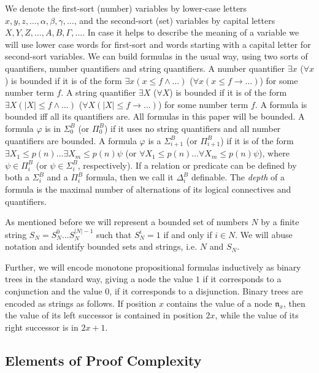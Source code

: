 \documentclass{LMCS}
\newcommand{\abs}[1]{\left\vert#1\right\vert}
\begin{document}
We denote the first-sort (number) variables by lower-case letters $ x,y,z,\dots,\alpha,\beta,\gamma,\dots$, and the second-sort (set)
variables by capital letters $ X,Y,Z,\dots,A,B,\Gamma,\dots$. In case it helps to describe the meaning of a variable we will use lower case words for first-sort and words starting with a capital letter for second-sort variables. We can build formulas in the usual way, using two sorts of
quantifiers, number quantifiers and string quantifiers. A number quantifier $\exists x$ ($\forall x$) is bounded
if it is of the form $\exists x (x\leq f\land\dots)$ ($\forall x (x\leq f\rightarrow\dots)$) for some number
term $f$. A string quantifier $\exists X$ ($\forall X$) is bounded if it is of the form $\exists X (\abs{X}\leq
f\land\dots)$ ($\forall X (\abs{X}\leq f\rightarrow\dots)$) for some number term $f$. A formula is bounded iff
all its quantifiers are. All formulas in this paper will be bounded. A formula $\varphi $ is in $\Sigma^B_0$ (or
$\Pi^B_{0}$) if it uses no string quantifiers and all number quantifiers are bounded. A formula $\varphi $ is a
$\Sigma^B_{i+1}$ (or $\Pi^B_{i+1}$) if it is of the form $\exists X_1\leq p(n)\dots\exists X_m\leq p(n) \psi$
(or $\forall X_1\leq p(n)\dots\forall X_m\leq p(n) \psi$), where $\psi\in\Pi^B_i$ (or $\psi\in\Sigma^B_i$,
respectively). If a relation or predicate can be defined by both a $\Sigma^B_i$ and a $\Pi^B_i$ formula, then we
call it $\Delta^B_i$ definable. The {\em depth} of a formula is the maximal number of alternations of its
logical connectives and quantifiers.

As mentioned before we will represent a bounded set of numbers $N$ by a finite string $S_N=S^0_N\dots
S^{\abs{N}-1}_N$ such that $S^i_N=1$ if and only if $i\in N$. We will abuse notation and identify bounded sets
and strings, i.e. $N$ and $S_N$.

Further, we will encode monotone propositional formulas inductively as binary trees in the standard way, giving
a node the value $1$ if it corresponds to a conjunction and the value $0$, if it corresponds to a disjunction.
Binary trees are encoded as strings as follows. If position $x$ contains the value of a node $\mathfrak{n}_x$,
then the value of its left successor is contained in position $2x$, while the value of its right successor is in
$2x+1$.

\subsection{Elements of Proof Complexity}\label{Sec:Elements Proof Cmpl}
\end{document}
